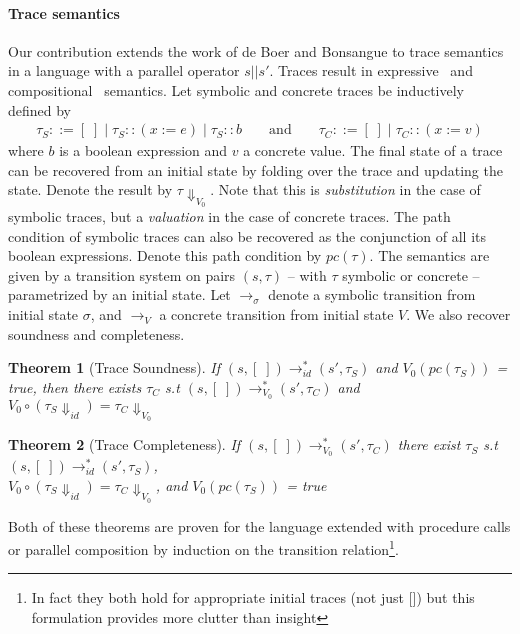 \documentclass[submission,copyright,creativecommons]{eptcs}
\newtheorem{theorem}{Theorem}
\begin{document}
\paragraph{Trace semantics}
Our contribution extends the work of de Boer and Bonsangue to trace semantics in a language with a parallel operator $s |\!| s'$.
Traces result in expressive~\cite{Mazurkiewicz1977} and compositional~\cite{din2022lagc} semantics.
Let symbolic and concrete traces be inductively defined by
\begin{align*}
  \tau_{S} ::= [\;] \mid \tau_{S} :: (x := e) \mid \tau_{S} :: b
  && \mbox{ and } &&
  \tau_{C} ::= [\;] \mid \tau_{C} :: (x := v)
\end{align*}
where $b$ is a boolean expression and $v$ a concrete value.
The final state of a trace can be recovered from an initial state by folding over
the trace and updating the state. Denote the result by $\tau\Downarrow_{V_{0}}$. Note that this is \emph{substitution}
in the case of symbolic traces, but a \emph{valuation} in the case of concrete traces.
The path condition of symbolic traces can also be recovered as the conjunction of all its boolean expressions.
Denote this path condition by $pc(\tau)$.
The semantics are given by a transition system on pairs $(s, \tau)$ -- with $\tau$ symbolic or concrete --
parametrized by an initial state. Let $\rightarrow_{\sigma}$ denote a symbolic transition from initial state $\sigma$,
and $\rightarrow_{V}$ a concrete transition from initial state $V$.
We also recover soundness and completeness.
\begin{theorem}[Trace Soundness]
  If $(s, [\;]) \rightarrow_{id}^{*} (s', \tau_{S})$ and $V_{0}(pc(\tau_{S}))$ = true,
  then there exists $\tau_{C}$ s.t $(s, [\;]) \rightarrow_{V_0}^{*} (s', \tau_{C})$ and
    $V_{0} \circ (\tau_{S}\Downarrow_{id}) = \tau_{C}\Downarrow_{V_{0}}$
\end{theorem}

\begin{theorem}[Trace Completeness]
  If $(s, [\;]) \rightarrow_{V_{0}}^{*} (s', \tau_{C})$ there exist $\tau_{S}$ s.t
  $(s, [\;]) \rightarrow_{id}^{*} (s', \tau_{S})$,\\
  $V_{0} \circ (\tau_{S} \Downarrow_{id}) = \tau_{C}\Downarrow_{V_{0}}$, and $V_{0}(pc(\tau_{S}))$ = true
\end{theorem}
Both of these theorems are proven for the language extended with procedure calls or parallel composition
by induction on the transition relation\footnote{In fact they both hold for appropriate initial traces (not just [])
but this formulation provides more clutter than insight}.
\end{document}
